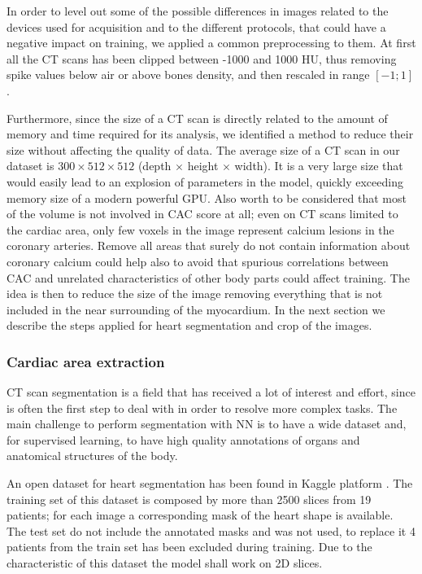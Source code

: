 In order to level out some of the possible differences in images related to the devices used for acquisition and to the different protocols, that could have a negative impact on training, we applied a common preprocessing to them.
At first all the CT scans has been clipped between -1000 and 1000 HU, thus removing spike values below air or above bones density, and then rescaled in range $[-1; 1]$.

Furthermore, since the size of a CT scan is directly related to the amount of memory and time required for its analysis, we identified a method to reduce their size without affecting the quality of data.
The average size of a CT scan in our dataset is $300\times512\times512$ (depth $\times$ height $\times$ width).
It is a very large size that would easily lead to an explosion of parameters in the model, quickly exceeding memory size of a modern powerful GPU.
Also worth to be considered that most of the volume is not involved in CAC score at all; even on CT scans limited to the cardiac area, only few voxels in the image represent calcium lesions in the coronary arteries.
Remove all areas that surely do not contain information about coronary calcium could help also to avoid that spurious correlations between CAC and unrelated characteristics of other body parts could affect training.
The idea is then to reduce the size of the image removing everything that is not included in the near surrounding of the myocardium.
In the next section we describe the steps applied for heart segmentation and crop of the images.


\subsubsection{Cardiac area extraction}

CT scan segmentation is a field that has received a lot of interest and effort, since is often the first step to deal with in order to resolve more complex tasks.
The main challenge to perform segmentation with NN is to have a wide dataset and, for supervised learning, to have high quality annotations of organs and anatomical structures of the body.

An open dataset for heart segmentation has been found in Kaggle platform \cite{kaggle_heart_dataset}.
The training set of this dataset is composed by more than 2500 slices from 19 patients; for each image a corresponding mask of the heart shape is available.
The test set do not include the annotated masks and was not used, to replace it 4 patients from the train set has been excluded during training.
Due to the characteristic of this dataset the model shall work on 2D slices.

